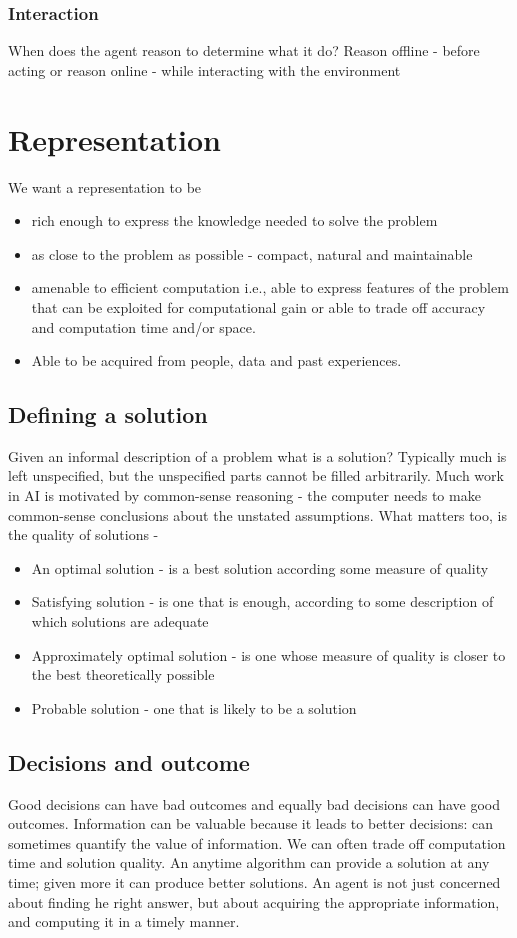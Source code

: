 \documentclass[a4paper]{article}
\theoremstyle{plain}
\theoremstyle{definition}
\theoremstyle{remark}
\begin{document}
\subsubsection{Interaction}
When does the agent reason to determine what it do? Reason offline - before acting or reason online - while interacting with the environment
\section{Representation}
We want a representation to be
\begin{itemize}
	\item rich enough to express the knowledge needed to solve the problem
	\item as close to the problem as possible - compact, natural and maintainable
	\item amenable to efficient computation i.e., able to express features of the problem that can be exploited for computational gain or able to trade off accuracy and computation time and/or space.
	\item Able to be acquired from people, data and past experiences.
\end{itemize}
\subsection{Defining a solution}
Given an informal description of a problem what is a solution? Typically much is left unspecified, but the unspecified parts cannot be filled arbitrarily. Much work in AI is motivated by common-sense reasoning - the computer needs to make common-sense conclusions about the unstated assumptions. What matters too, is the quality of solutions -
\begin{itemize}
	\item An optimal solution - is a best solution according some measure of quality
	\item Satisfying solution - is one that is enough, according to some description of which solutions are adequate
	\item Approximately optimal solution - is one whose measure of quality is closer to the best theoretically possible
	\item Probable solution - one that is likely to be a solution
\end{itemize}
\subsection{Decisions and outcome}
Good decisions can have bad outcomes and equally bad decisions can have good outcomes. Information can be valuable because it leads to better decisions: can sometimes quantify the value of information. We can often trade off computation time and solution quality. An anytime algorithm can provide a solution at any time; given more it can produce better solutions. An agent is not just concerned about finding he right answer, but about acquiring the appropriate information, and computing it in a timely manner.
\end{document}

